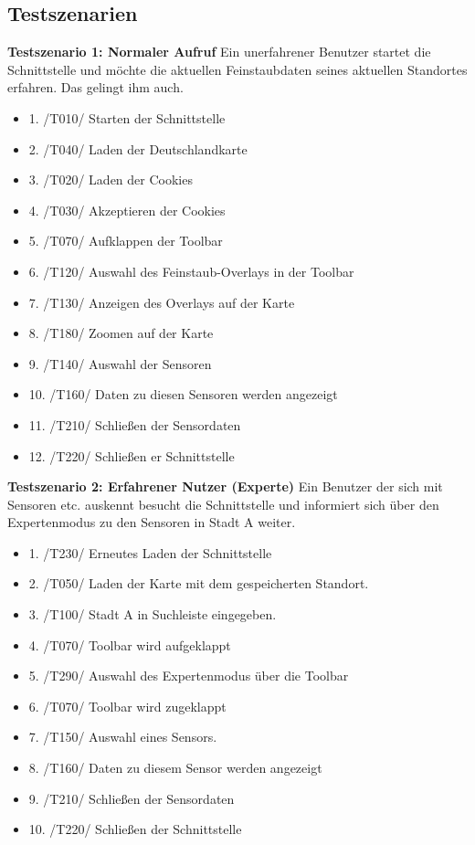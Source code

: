 \subsection{Testszenarien}

\textbf{Testszenario 1: Normaler Aufruf}
\newline
Ein unerfahrener Benutzer startet die Schnittstelle und möchte die aktuellen Feinstaubdaten seines aktuellen Standortes erfahren. Das gelingt ihm auch.
\begin{itemize} [noitemsep]
    \item 1. /T010/ Starten der Schnittstelle
    \item 2. /T040/ Laden der Deutschlandkarte
    \item 3. /T020/ Laden der Cookies
    \item 4. /T030/ Akzeptieren der Cookies
    \item 5. /T070/ Aufklappen der Toolbar
    \item 6. /T120/ Auswahl des Feinstaub-Overlays in der Toolbar
    \item 7. /T130/ Anzeigen des Overlays auf der Karte
    \item 8. /T180/ Zoomen auf der Karte
    \item 9. /T140/ Auswahl der Sensoren
    \item 10. /T160/ Daten zu diesen Sensoren werden angezeigt
    \item 11. /T210/ Schließen der Sensordaten
    \item 12. /T220/ Schließen er Schnittstelle
\end{itemize}

\textbf{Testszenario 2: Erfahrener Nutzer (Experte)}
\newline
Ein Benutzer der sich mit Sensoren etc. auskennt besucht die Schnittstelle und informiert sich über den Expertenmodus zu den Sensoren in Stadt A weiter.
\begin{itemize} [noitemsep]
    \item 1. /T230/ Erneutes Laden der Schnittstelle
    \item 2. /T050/ Laden der Karte mit dem gespeicherten Standort.
    \item 3. /T100/ Stadt A in Suchleiste eingegeben.
    \item 4. /T070/ Toolbar wird aufgeklappt
    \item 5. /T290/ Auswahl des Expertenmodus über die Toolbar
    \item 6. /T070/ Toolbar wird zugeklappt
    \item 7. /T150/ Auswahl eines Sensors.
    \item 8. /T160/ Daten zu diesem Sensor werden angezeigt
    \item 9. /T210/ Schließen der Sensordaten
    \item 10. /T220/ Schließen der Schnittstelle
\end{itemize}

